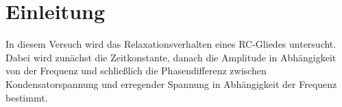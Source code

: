 
\section{Einleitung}

In diesem Versuch wird das Relaxationsverhalten eines RC-Gliedes
untersucht. Dabei wird zunächst die Zeitkonstante, danach die Amplitude
in Abhängigkeit von der Frequenz und schließlich die Phasendifferenz
zwischen Kondensatorspannung und erregender Spannung in Abhängigkeit der
Frequenz bestimmt.
